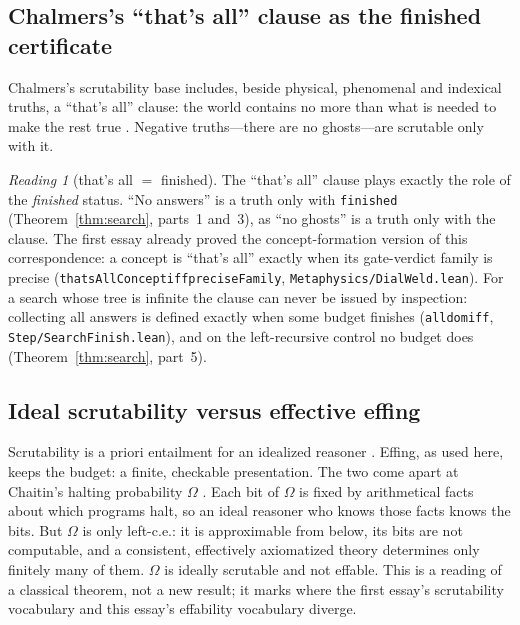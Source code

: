 \documentclass[]{article}
\theoremstyle{definition}
\theoremstyle{remark}
\newtheorem{reading}[theorem]{Reading}
\newcommand{\codeus}{\textunderscore\allowbreak}
\newcommand{\code}[1]{\texttt{\let\_\codeus #1}}
\newcommand{\lpath}[1]{{\ttfamily\nolinkurl{#1}}}
\newcommand{\Om}{\Omega}
\newcommand{\meta}[1]{\lpath{Metaphysics/#1.lean}}
\newcommand{\step}[1]{\lpath{Step/#1.lean}}
\begin{document}
\subsection{Chalmers's ``that's all'' clause as the finished certificate}
\label{sec:thatsall}

Chalmers's scrutability base includes, beside physical, phenomenal and indexical truths, a ``that's
all'' clause: the world contains no more than what is needed to make the rest true
\cite{ChalmersJackson2001, Chalmers2012}. Negative truths---there are no ghosts---are scrutable only
with it.

\begin{reading}[that's all $=$ finished]
\label{read:thatsall}
The ``that's all'' clause plays exactly the role of the \emph{finished} status. ``No answers'' is a
truth only with \code{finished} (Theorem~\ref{thm:search}, parts~1 and~3), as ``no ghosts'' is a truth
only with the clause. The first essay already proved the concept-formation version of this
correspondence: a concept is ``that's all'' exactly when its gate-verdict family is precise
(\code{thatsAllConcept\_iff\_preciseFamily}, \meta{DialWeld}). For a search whose tree is infinite the
clause can never be issued by inspection: collecting all answers is defined exactly when some budget
finishes (\code{all\_dom\_iff}, \step{SearchFinish}), and on the left-recursive control no budget does
(Theorem~\ref{thm:search}, part~5).
\end{reading}

\subsection{Ideal scrutability versus effective effing}
\label{sec:scrutability}

Scrutability is a priori entailment for an idealized reasoner \cite{Chalmers2012}. Effing, as used
here, keeps the budget: a finite, checkable presentation. The two come apart at Chaitin's halting
probability $\Om$ \cite{Chaitin1975}. Each bit of $\Om$ is fixed by arithmetical facts about which
programs halt, so an ideal reasoner who knows those facts knows the bits. But $\Om$ is only
left-c.e.: it is approximable from below, its bits are not computable, and a consistent, effectively
axiomatized theory determines only finitely many of them. $\Om$ is ideally scrutable and not
effable. This is a reading of a classical theorem, not a new result; it marks where the first essay's
scrutability vocabulary and this essay's effability vocabulary diverge.
\end{document}
